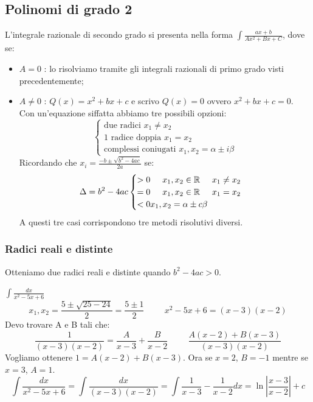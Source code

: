 \subsection*{Polinomi di grado 2}
L'integrale razionale di secondo grado si presenta nella forma $\int\frac{ax+b}{Ax^2+Bx+C}$, dove se:
\begin{itemize}
    \item $A=0$ : lo risolviamo tramite gli integrali razionali di primo grado visti precedentemente;
    \item $A\neq0$ : $Q(x)=x^2+bx+c$ e scrivo $Q(x)=0$ ovvero $x^2+bx+c=0$. Con un'equazione siffatta abbiamo tre possibili opzioni:
    $$\begin{cases}\text{due radici } x_1\neq x_2\\1 \text{ radice doppia }x_1=x_2\\\text{complessi coniugati }x_1,x_2=\alpha\pm i\beta
    \end{cases}$$
    Ricordando che $x_i=\frac{-b\pm\sqrt{b^2-4ac}}{2a}$ se:
    $$\Delta = b^2-4ac\begin{cases}>0\hspace{.5cm}x_1,x_2\in\mathbb{R}\hspace{.5cm}x_1\neq x_2\\
    =0\hspace{.5cm}x_1,x_2\in\mathbb{R}\hspace{.5cm}x_1=x_2\\
    <0 x_1,x_2=\alpha\pm c\beta
    \end{cases}$$
    A questi tre casi corrispondono tre metodi risolutivi diversi.
\end{itemize}

\subsubsection{Radici reali e distinte}
Otteniamo due radici reali e distinte quando $b^2-4ac>0$.
\begin{example} $\int\frac{dx}{x^2-5x+6}$
\begin{equation*}x_1,x_2=\frac{5\pm\sqrt{25-24}}{2}=\frac{5\pm1}{2}\hspace{1cm}x^2-5x+6=(x-3)(x-2)\end{equation*}
Devo trovare A e B tali che:
\begin{equation*}\frac{1}{(x-3)(x-2)}=\frac{A}{x-3}+\frac{B}{x-2}\hspace{1cm}\frac{A(x-2)+B(x-3)}{(x-3)(x-2)}\end{equation*}
Vogliamo ottenere $1=A(x-2)+B(x-3)$. Ora se $x=2$, $B=-1$ mentre se $x=3$, $A=1$.
\begin{equation*}\int\frac{dx}{x^2-5x+6}=\int\frac{dx}{(x-3)(x-2)}=\int\frac{1}{x-3}-\frac{1}{x-2}dx=\ln|\frac{x-3}{x-2}|+c\end{equation*}
\end{example}

